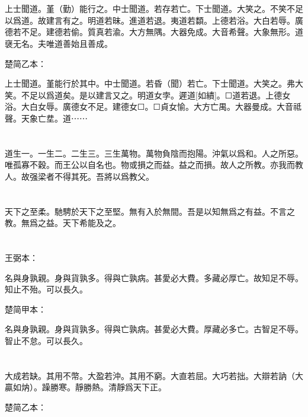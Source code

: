 \documentclass[a5paper]{ctexbook}
\begin{document}
    \chapter{}

    上士聞道。堇（勤）能行之。中士聞道。若存若亡。下士聞道。大笑之。不笑不足以爲道。故建言有之。明道若昧。進道若退。夷道若纇。上德若浴。大白若辱。廣德若不足。建德若偷。質真若渝。大方無隅。大器免成。大音希聲。大象無形。道襃无名。夫唯道善始且善成。

    楚简乙本：

    上士聞道。堇能行於其中。中士聞道。若昏（聞）若亡。下士聞道。大笑之。弗大笑。不足以爲道矣。是以建言又之。明道女孛。遲道[如繢]。☐道若退。上德女浴。大白女辱。廣德女不足。建德女☐。☐貞女愉。大方亡禺。大器曼成。大音祗聲。天象亡坓。道⋯⋯

    \chapter{}

    道生一。一生二。二生三。三生萬物。萬物負陰而抱陽。沖氣以爲和。人之所惡。唯孤寡不穀。而王公以自名也。物或損之而益。益之而損。故人之所教。亦我而教人。故强梁者不得其死。吾將以爲教父。

    \chapter{}

    天下之至柔。馳騁於天下之至堅。無有入於無間。吾是以知無爲之有益。不言之教。無爲之益。天下希能及之。

    \chapter{}
    王弼本：

    名與身孰親。身與貨孰多。得與亡孰病。甚愛必大費。多藏必厚亡。故知足不辱。知止不殆。可以長久。

    楚简甲本：

    名與身孰親。身與貨孰多。得與亡孰病。甚愛必大費。厚藏必多亡。古智足不辱。智止不怠。可以長久。

    \chapter{}

    大成若缺。其用不幣。大盈若沖。其用不窮。大直若屈。大巧若拙。大辯若訥（大贏如㶧）。躁勝寒。靜勝熱。清靜爲天下正。

    楚简乙本：
\end{document}
